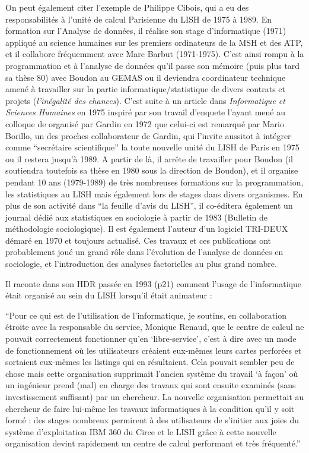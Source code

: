 On peut également citer l'exemple de Philippe Cibois, qui a eu des responsabilités à l'unité de calcul Parisienne du LISH de 1975 à 1989. En formation sur l’Analyse de données, il réalise son stage d’informatique (1971) appliqué au science humaines sur les premiers ordinateurs de la MSH et des ATP, et il collabore fréquemment avec Marc Barbut (1971-1975). C’est ainsi rompu à la programmation et à l’analyse de données qu’il passe son mémoire (puis plus tard sa thèse 80) avec Boudon au GEMAS ou il deviendra coordinateur technique amené à travailler sur la partie informatique/statistique de divers contrats et projets (\textit{l’inégalité des chances}). C’est suite à un article dans \textit{Informatique et Sciences Humaines} en 1975 inspiré par son travail d’enquete l’ayant mené au colloque de organisé par Gardin en 1972 que celui-ci est remarqué par Mario Borillo, un des proches collaborateur de Gardin, qui l’invite aussitot à intégrer comme \enquote{secrétaire scientifique} la toute nouvelle unité du LISH de Paris en 1975 ou il restera jusqu’à 1989. A partir de là, il arrête de travailler pour Boudon (il soutiendra toutefois sa thèse en 1980 sous la direction de Boudon), et il organise pendant 10 ans (1979-1989) de très nombreuses formations sur la programmation, les statistiques au LISH mais également lors de stages dans divers organismes. En plus de son activité dans \enquote{la feuille d’avis du LISH}, il co-éditera également un journal dédié aux statistiques en sociologie à partir de 1983 (Bulletin de méthodologie sociologique). Il est également l’auteur d’un logiciel TRI-DEUX démaré en 1970 et toujours actualisé. Ces travaux et ces publications ont probablement joué un grand rôle dans l’évolution de l’analyse de données en sociologie, et l’introduction des analyses factorielles au plus grand nombre.

Il raconte dans son HDR passée en 1993 (p21) comment l’usage de l’informatique était organisé au sein du LISH lorsqu’il était animateur  :

\enquote{Pour ce qui est de l'utilisation de l'informatique, je soutins, en collaboration étroite avec la responsable du service, Monique Renaud, que le centre de calcul ne pouvait correctement fonctionner qu'en \enquote{libre-service}, c'est à dire avec un mode de fonctionnement où les utilisateurs créaient eux-mêmes leurs cartes perforées et sortaient eux-mêmes les listings qui en résultaient. Cela pouvait sembler peu de chose mais cette organisation supprimait l'ancien système du travail \enquote{à  façon} où un ingénieur  prend (mal) en charge des travaux  qui sont ensuite examinés (sans investissement suffisant) par un chercheur. La nouvelle organisation permettait au chercheur de faire lui-même les travaux informatiques à la condition qu'il y soit formé : des stages nombreux permirent à des utilisateurs de s'initier aux joies du système d'exploitation IBM 360 du Circe et le LISH grâce à cette nouvelle organisation devint rapidement un centre de calcul performant et très fréquenté.}

